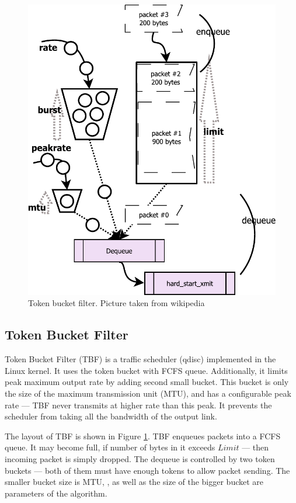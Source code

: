 \begin{figure}
	\centering
	\includegraphics[width=137mm]{drawings/tbf}
	\caption{Token bucket filter. Picture taken from wikipedia \cite{TBF:picture}}
	
	\label{fig09:tbf}
\end{figure}

\subsection{Token Bucket Filter}
Token Bucket Filter (TBF) is a traffic scheduler (qdisc) implemented in the Linux kernel. It uses the token bucket with FCFS queue. Additionally, it limits peak maximum output rate by adding second small bucket. This bucket is only the size of the maximum transmission unit (MTU), and has a configurable peak rate --- TBF never transmits at higher rate than this peak. It prevents the scheduler from taking all the bandwidth of the output link.

The layout of TBF is shown in Figure \ref{fig09:tbf}. TBF enqueues packets into a FCFS queue. It may become full, if number of bytes in it exceeds $Limit$ --- then incoming packet is simply dropped. The dequeue is controlled by two token buckets --- both of them must have enough tokens to allow packet sending. The smaller bucket size is MTU, ,  as well as the size of the bigger bucket  are parameters of the algorithm.

